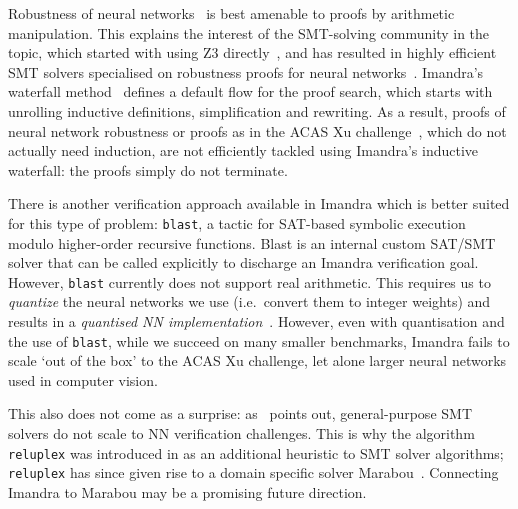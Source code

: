 \documentclass[runningheads]{llncs}
\begin{document}
   Robustness of neural networks~\cite{CKDKKAE22} is best amenable to proofs by arithmetic manipulation. This explains the interest of the SMT-solving community in the topic, which started with using Z3 directly~\cite{HuangKWW17}, and has resulted in highly efficient SMT solvers specialised on robustness proofs for neural networks~\cite{KaBaDiJuKo17Reluplex,KatzHIJLLSTWZDK19}.   Imandra's waterfall method~\cite{PassmoreCIABKKM20} defines a default flow for the proof search, which starts with unrolling inductive definitions, simplification and rewriting.
  As a result, proofs of neural network robustness or proofs as in the ACAS Xu challenge~\cite{KaBaDiJuKo17Reluplex,KatzHIJLLSTWZDK19}, which do not actually need induction,
  are not efficiently tackled using Imandra's inductive waterfall: the proofs simply do not terminate.

There is another verification approach available in Imandra which is better suited for this type of problem:  \lstinline{blast}, a tactic for SAT-based symbolic execution modulo
higher-order recursive functions. Blast is an internal custom SAT/SMT solver that can be called explicitly to discharge an Imandra verification goal.
 However, \lstinline{blast} currently does not support real arithmetic. This
 requires us to \emph{quantize} the neural networks we use (i.e.\ convert them to
 integer weights) and results in a \emph{quantised NN implementation}~\cite{DPKD22}.
 However, even with quantisation and the use of  \lstinline{blast}, while we succeed on many smaller benchmarks, Imandra fails to scale `out of the box' to the ACAS Xu challenge, let alone larger neural networks used in computer vision.

 This also does not come as a surprise: as~\cite{KaBaDiJuKo17Reluplex} points out, general-purpose SMT solvers do not scale to NN verification challenges.
This is why the algorithm \lstinline{reluplex} was introduced in \cite{KaBaDiJuKo17Reluplex} as an additional heuristic to SMT solver algorithms;
\lstinline{reluplex} has since given rise to a domain specific solver Marabou~\cite{KatzHIJLLSTWZDK19}.
Connecting Imandra to Marabou may be a promising future direction. 
\end{document}
